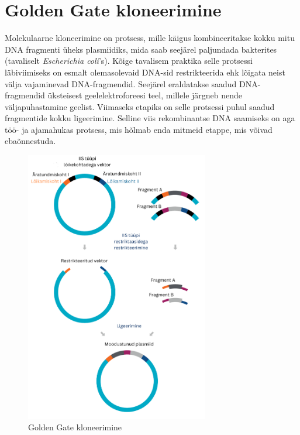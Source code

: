 \documentclass{trkut}%
\begin{document}
\section{Golden Gate kloneerimine}

Molekulaarne kloneerimine on protsess, mille käigus kombineeritakse kokku mitu DNA fragmenti üheks plasmiidiks, mida saab seejärel paljundada bakterites (tavaliselt \textit{Escherichia coli}'s). Kõige tavalisem praktika selle protsessi läbiviimiseks on esmalt olemasolevaid DNA-sid restrikteerida ehk lõigata neist välja vajaminevad DNA-fragmendid. Seejärel eraldatakse saadud DNA-fragmendid üksteisest geelelektroforeesi teel, millele järgneb nende väljapuhastamine geelist. Viimaseks etapiks on selle protsessi puhul saadud fragmentide kokku ligeerimine. Selline viis rekombinantse DNA saamiseks on aga töö- ja ajamahukas protsess, mis hõlmab enda mitmeid etappe, mis võivad ebaõnnestuda. \parencite{ggkloneerimine}

\begin{figure}[htbp]
	\includegraphics[width=8cm]{gg.png}
	\caption{Golden Gate kloneerimine}
	\label{ggjoonis}
\end{figure}
\end{document}
